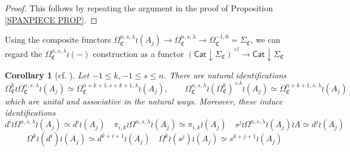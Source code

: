 \documentclass[a4paper,10pt
,draft
]{article}%
\numberwithin{equation}{section}
\numberwithin{figure}{section}
\newtheorem{corollary}[equation]{Corollary}%
\theoremstyle{definition} %
\newcommand{\1}{\ensuremath{\mathbbm 1}}%
\newcommand{\OC}{\Omega_{\mathfrak C}}
\begin{document}
\begin{proof}
This follows by repeating the argument in the proof of Proposition \ref{SPANPIECE PROP}.
\end{proof}


 
Using the composite functors
$\Omega_{\mathfrak{C}}^{n,s,\lambda} \wr (A_j)
\to \Omega_{\mathfrak{C}}^{n,s,\lambda} 
\to \Omega^{-1,0}_{\mathfrak{C}} = \Sigma_{\mathfrak{C}}$,
we can regard the 
$\Omega_{\mathfrak{C}}^{n,s,\lambda} \wr (-)$
construction as a functor
$\left(\mathsf{Cat}\downarrow \Sigma_{\mathfrak{C}}\right)^{\times l}
\to \mathsf{Cat}\downarrow \Sigma_{\mathfrak{C}}$

\begin{corollary}[{cf. \cite[Cor. 5.32]{BP_geo}}]
      \label{LABIDEN_COR}
Let $-1 \leq k, -1 \leq s \leq n$.
There are natural identifications
\[
	\OC^k \wr \OC^{n,s,\lambda} \wr (A_j) \simeq
	\OC^{n+k+1,s+k+1,\lambda} \wr (A_j),
\qquad
	\OC^{n,s,\lambda} \wr (\OC^k)^{\times \lambda} \wr (A_j) \simeq
	\OC^{n+k+1,s,\lambda} \wr (A_j)	
\]
which are unital and associative in the natural ways.
Moreover, these induce identifications
\[
d^i \wr \Omega^{n,s,\lambda} \wr (A_j) \simeq d^i \wr (A_j)
	\quad
\pi_{i,k} \wr \Omega^{n,s,\lambda} \wr (A_j) \simeq \pi_{i,k} \wr (A_j)
	\quad
s^j \wr \Omega^{n,s,\lambda} \wr (A_j) \wr A \simeq d^j \wr  (A_j)
\]
\[
\Omega^k \wr (d^i) \wr (A_j) \simeq d^{k+i+1} \wr (A_j)
	\quad
\Omega^k \wr (s^j) \wr (A_j) \simeq s^{k+j+1} \wr (A_j)
\]
\end{corollary}
\end{document}
